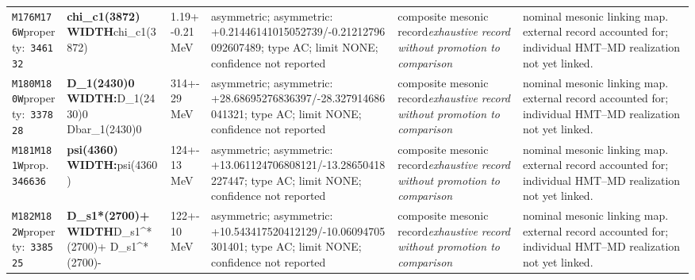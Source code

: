 \begin{landscape}
\begin{longtable}{L{1.85cm}L{4.45cm}L{2.35cm}L{4.05cm}L{3.35cm}L{7.15cm}}
\texttt{M176}\newline \texttt{M176W}\newline property:\ \texttt{346132} & \textbf{chi\_\allowbreak{}c1(3872) WIDTH}\newline chi\_\allowbreak{}c1(3872) & 1.19+-0.21\,MeV & asymmetric; asymmetric: +0.21446141015052739/-0.21212796092607489; type AC; limit NONE; confidence not reported & composite mesonic record\newline \emph{exhaustive record without promotion to comparison} & nominal mesonic linking map. external record accounted for; individual HMT--MD realization not yet linked. \\
\texttt{M180}\newline \texttt{M180W}\newline property:\ \texttt{337828} & \textbf{D\_\allowbreak{}1(2430)0 WIDTH:}\newline D\_\allowbreak{}1(2430)0 \textbar{}\allowbreak{} Dbar\_\allowbreak{}1(2430)0 & 314+-29\,MeV & asymmetric; asymmetric: +28.68695276836397/-28.327914686041321; type AC; limit NONE; confidence not reported & composite mesonic record\newline \emph{exhaustive record without promotion to comparison} & nominal mesonic linking map. external record accounted for; individual HMT--MD realization not yet linked. \\
\texttt{M181}\newline \texttt{M181W}\newline prop.\ \texttt{346636} & \textbf{psi(4360) WIDTH:}\newline psi(4360) & 124+-13\,MeV & asymmetric; asymmetric: +13.061124706808121/-13.28650418227447; type AC; limit NONE; confidence not reported & composite mesonic record\newline \emph{exhaustive record without promotion to comparison} & nominal mesonic linking map. external record accounted for; individual HMT--MD realization not yet linked. \\
\texttt{M182}\newline \texttt{M182W}\newline property:\ \texttt{338525} & \textbf{D\_\allowbreak{}s1*(2700)+ WIDTH}\newline D\_\allowbreak{}s1\textasciicircum{}*(2700)+ \textbar{}\allowbreak{} D\_\allowbreak{}s1\textasciicircum{}*(2700)- & 122+-10\,MeV & asymmetric; asymmetric: +10.543417520412129/-10.06094705301401; type AC; limit NONE; confidence not reported & composite mesonic record\newline \emph{exhaustive record without promotion to comparison} & nominal mesonic linking map. external record accounted for; individual HMT--MD realization not yet linked. \\

\end{longtable}
\end{landscape}

